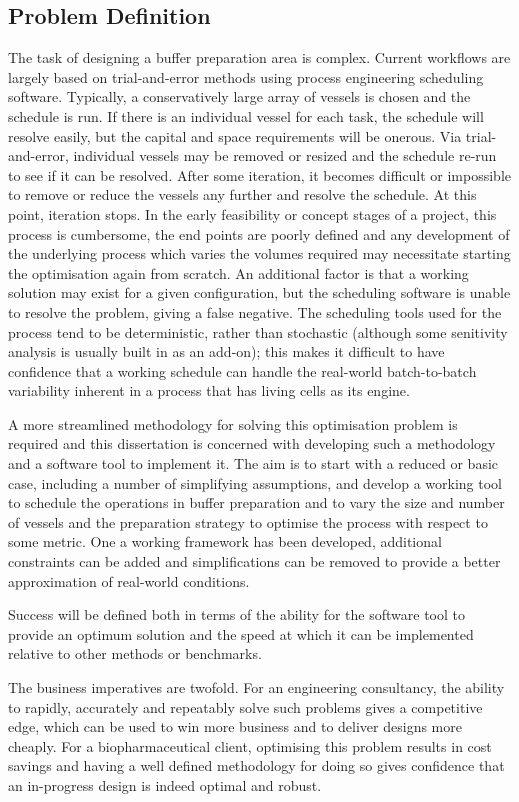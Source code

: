 \subsection{Problem Definition}\label{SS.probdef}

The task of designing a buffer preparation area is complex.
Current workflows are largely based on trial-and-error methods using process
engineering scheduling software.  
Typically, a conservatively large array of vessels is chosen and the schedule
is run.  
If there is an individual vessel for each task, the schedule will resolve
easily, but the capital and space requirements will be onerous.
Via trial-and-error, individual vessels may be removed or resized and
the schedule re-run to see if it can be resolved.  
After some iteration, it becomes difficult or impossible to remove or reduce
the vessels any further and resolve the schedule.
At this point, iteration stops.
In the early feasibility or concept stages of a project, this process is
cumbersome, the end points are poorly defined and any development of the
underlying process which varies the volumes required may necessitate starting
the optimisation again from scratch.
An additional factor is that a working solution may exist for a given
configuration, but the scheduling software is unable to resolve the problem,
giving a false negative. 
The scheduling tools used for the process tend to be deterministic, rather than
stochastic (although some senitivity analysis is usually built in as an 
add-on); this makes it difficult to have confidence that a working schedule can
handle the real-world batch-to-batch variability inherent in a process that has
living cells as its engine.

A more streamlined methodology for solving this optimisation problem is
required and this dissertation is concerned with developing such a methodology
and a software tool to implement it.
The aim is to start with a reduced or basic case, including a number of
simplifying assumptions, and develop a working tool to schedule the operations
in buffer preparation and to vary the size and number of vessels and the 
preparation strategy to optimise the process with respect to some metric.
One a working framework has been developed, additional constraints can be added
and simplifications can be removed to provide a better approximation of 
real-world conditions.

Success will be defined both in terms of the ability for the software tool to
provide an optimum solution and the speed at which it can be implemented
relative to other methods or benchmarks.

The business imperatives are twofold.
For an engineering consultancy, the ability to rapidly, accurately and
repeatably solve such problems gives a competitive edge, which can be used to
win more business and to deliver designs more cheaply.  For a biopharmaceutical
client, optimising this problem results in cost savings and having a well
defined methodology for doing so gives confidence that an in-progress design is
indeed optimal and robust.

